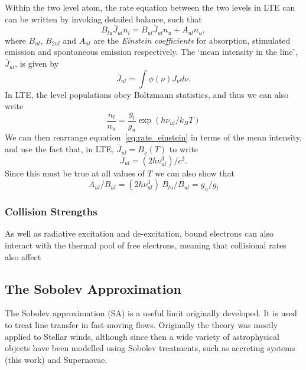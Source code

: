 Within the two level atom, the rate equation between the two levels in LTE can
can be written by invoking detailed balance, such that 
\begin{equation}
B_{lu} \bar{J}_{ul} n_l = B_{ul} \bar{J}_{ul} n_u + A_{ul} n_u,
\label{eq:rate_einstein}
\end{equation}
where $B_{ul}$, $B_{2ul}$ and $A_{ul}$ are the {\em Einstein coefficients}
for absorption, stimulated emission and spontaneous emission respectively.
The `mean intensity in the line', $\bar{J}_{ul}$, is given by
\begin{equation}
\bar{J}_{ul} = \int \phi(\nu) J_\nu d\nu.
\label{eq:jbar}
\end{equation}
In LTE, the level populations obey Boltzmann statistics, and thus we can also
write
\begin{equation}
\frac{n_l}{n_u} = \frac{g_l}{g_u} \exp (h \nu_{ul} / k_B T)
\end{equation}
We can then rearrange equation~\ref{eq:rate_einstein} in terms of the mean intensity,
and use the fact that, in LTE, $\bar{J}_{ul} = B_\nu (T)$ to write
\begin{equation}
\bar{J}_{ul} = (2 h \nu_{ul}^3) / c^2.
\end{equation}
Since this must be true at all values of $T$ we can also show that 
\begin{equation}
A_{ul} / B_{ul} = (2 h \nu_{ul}^3)~B_{lu} / B_{ul} = g_u / g_l
\end{equation}



\subsubsection{Collision Strengths}

As well as radiative excitation and de-excitation, bound electrons 
can also interact with the thermal pool of free electrons, meaning that
collisional rates also affect 




\subsection{The Sobolev Approximation}

The Sobolev approximation (SA) is a useful limit originally developed.
It is used to treat line transfer in fast-moving flows. Originally 
the theory was mostly applied to Stellar winds, although since then
a wide variety of astrophysical objects have been modelled using Sobolev treatments,
such as accreting systems (this work) and Supernovae.

